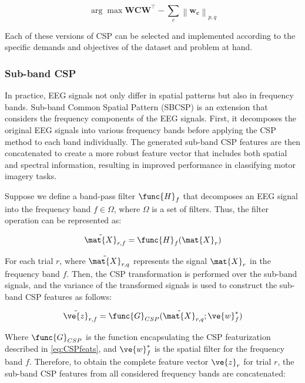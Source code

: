 \begin{equation}
    \arg \max \mathbf{W}\mathbf{C} \mathbf{W}^{\top}-\sum_c\left\|\mathbf{w}_{\mathbf{c}}\right\|_{p, q}
\end{equation}



Each of these versions of CSP can be selected and implemented according to the specific demands and objectives of the dataset and problem at hand.

\subsubsection{Sub-band CSP}

In practice, EEG signals not only differ in spatial patterns but also in frequency bands. Sub-band Common Spatial Pattern (SBCSP) is an extension that considers the frequency components of the EEG signals. First, it decomposes the original EEG signals into various frequency bands before applying the CSP method to each band individually. The generated sub-band CSP features are then concatenated to create a more robust feature vector that includes both spatial and spectral information, resulting in improved performance in classifying motor imagery tasks.

Suppose we define a band-pass filter $\func{H}_f$ that decomposes an EEG signal into the frequency band $f \in \Omega$, where $\Omega$ is a set of filters. Thus, the filter operation can be represented as:

\begin{equation}
\tilde{\mat{X}}_{r,f} = \func{H}_f(\mat{X}_r)    
\end{equation}

For each trial $r$, where $\tilde{\mat{X}}_{r,q}$ represents the signal $\mat{X}_r$ in the frequency band $f$. Then, the CSP transformation is performed over the sub-band signals, and the variance of the transformed signals is used to construct the sub-band CSP features as follows:

\begin{equation}
\tilde{\ve{z}}_{r,f} = \func{G}_{CSP}(\tilde{\mat{X}}_{r,q}; \ve{w}_{f}^{*})    
\end{equation}

Where $\func{G}_{CSP}$ is the function encapsulating the CSP featurization described in \eqref{eq:CSPfeats}, and $\ve{w}^{*}_{f}$ is the spatial filter for the frequency band $f$. Therefore, to obtain the complete feature vector $\ve{z}_r$ for trial $r$, the sub-band CSP features from all considered frequency bands are concatenated:

